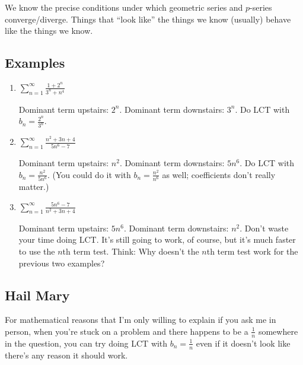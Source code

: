 \documentclass[11pt]{article}
\begin{document}
We know the precise conditions under which geometric series and $p$-series
converge/diverge. Things that ``look like'' the things we know (usually) behave
like the things we know.

\subsection{Examples}

\begin{enumerate}

  \item $\displaystyle \sum_{n=1}^\infty \frac{1+2^n}{3^n+n^4}$

  Dominant term upstairs: $2^n$. Dominant term downstairs: $3^n$. Do LCT with
  $b_n = \displaystyle \frac{2^n}{3^n}$.

  \item $\displaystyle \sum_{n=1}^\infty \frac{n^2 + 3n + 4}{5n^6-7}$

  Dominant term upstairs: $n^2$. Dominant term downstairs: $5n^6$. Do LCT with
  $b_n = \displaystyle \frac{n^2}{5n^6}$. (You could do it with $b_n =
  \displaystyle \frac{n^2}{n^6}$ as well; coefficients don't really matter.)

  \item $\displaystyle \sum_{n=1}^\infty \frac{5n^6-7}{n^2 + 3n + 4}$

  Dominant term upstairs: $5n^6$. Dominant term downstairs: $n^2$.
  \color{red}Don't waste your time doing LCT. It's still going to work, of
  course, but it's much faster to use the $n$th term test. \color{black} Think:
  Why doesn't the $n$th term test work for the previous two examples?

\end{enumerate}

\newpage
\subsection{Hail Mary}

For mathematical reasons that I'm only willing to explain if you ask me in
person, when you're stuck on a problem and there happens to be a $\displaystyle
\frac1n$ somewhere in the question, you can try doing LCT with $\displaystyle
b_n = \frac1n$ even if it doesn't look like there's any reason it should work.
\\
\end{document}

